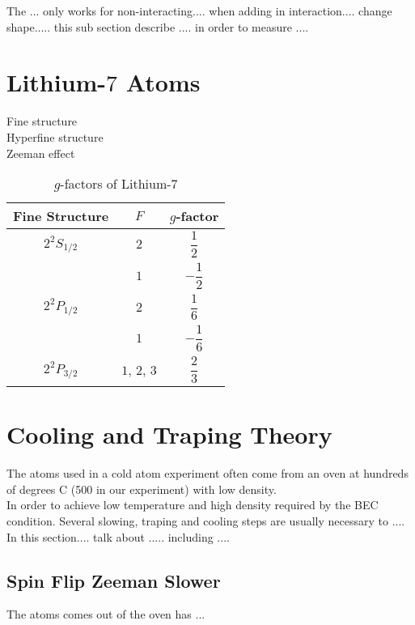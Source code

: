 The ... only works for non-interacting.... when adding in interaction.... change shape..... this sub section describe .... in order to measure ....

\section{Lithium-$7$ Atoms}

Fine structure\\
Hyperfine structure\\
Zeeman effect

\begin{table}
\caption{$g$-factors of Lithium-$7$}
\label{li7:g-factors}
\begin{center}
\begin{tabular}{|c|c|c|}\hline
Fine Structure & $F$ & $g$-factor \\\hline
$2^2S_{1/2}$ & $2$ & $\dfrac 12$ \\\cline{2-3}
 & $1$ & $-\dfrac 12$ \\\hline
$2^2P_{1/2}$ & $2$ & $\dfrac 16$ \\\cline{2-3}
 & $1$ & $-\dfrac 16$ \\\hline
$2^2P_{3/2}$ & $1$, $2$, $3$ & $\dfrac 23$ \\\hline
\end{tabular}
\end{center}
\end{table}


\section{Cooling and Traping Theory}
The atoms used in a cold atom experiment often come from an oven at hundreds of degrees C (500 in our experiment) with low density.\\
In order to achieve low temperature and high density required by the BEC condition. Several slowing, traping and cooling steps are usually necessary to ....\\
In this section.... talk about ..... including ....\\

\subsection{Spin Flip Zeeman Slower}\label{theory:zeeman}

The atoms comes out of the oven has ...\\

